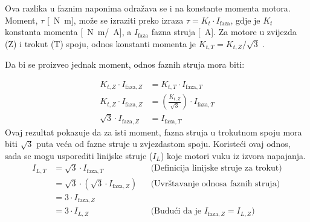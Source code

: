 \documentclass[diplomskirad]{fer}
\begin{document}
Ova razlika u faznim naponima odražava se i na konstante momenta motora.
Moment, $\tau$ [\SI{}{\newton\metre}], može se izraziti preko izraza $\tau =
	K_t \cdot I_{\text{faza}}$, gdje je $K_t$ konstanta momenta
	[\SI{}{\newton\metre}/\SI{}{\ampere}], a $I_{\text{faza}}$ fazna struja
	[\SI{}{\ampere}]. Za motore u zvijezda (Z) i trokut (T) spoju, odnos konstanti
momenta je $K_{t, T} = K_{t, Z} / \sqrt{3}$ \cite{cite:disertacija}.

Da bi se proizveo jednak moment, odnos faznih struja mora biti:

\begin{align*}
	K_{t,Z} \cdot I_{\text{faza},Z}  & = K_{t,T} \cdot I_{\text{faza},T}                                 \\
	K_{t,Z} \cdot I_{\text{faza},Z}  & = \left( \frac{K_{t,Z}}{\sqrt{3}} \right) \cdot I_{\text{faza},T} \\
	\sqrt{3} \cdot I_{\text{faza},Z} & = I_{\text{faza},T}
\end{align*}
Ovaj rezultat pokazuje da za isti moment, fazna struja u trokutnom spoju mora biti $\sqrt{3}$ puta veća od fazne struje u zvjezdastom spoju.
Koristeći ovaj odnos, sada se mogu usporediti linijske struje ($I_L$) koje motori vuku iz izvora napajanja.
\begin{align*}
	I_{L,T} & = \sqrt{3} \cdot I_{\text{faza},T}                  &  & \text{(Definicija linijske struje za trokut)}              \\
	        & = \sqrt{3} \cdot (\sqrt{3} \cdot I_{\text{faza},Z}) &  & \text{(Uvrštavanje odnosa faznih struja)}                  \\
	        & = 3 \cdot I_{\text{faza},Z}                                                                                         \\
	        & = 3 \cdot I_{L,Z}                                   &  & \text{(Budući da je } I_{\text{faza},Z} = I_{L,Z} \text{)}
\end{align*}
\end{document}
